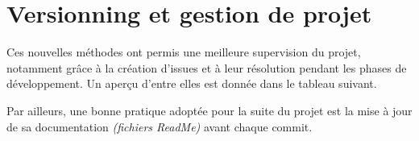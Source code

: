 \section{Versionning et gestion de projet}\label{sec:versionning-et-gestion-de-projet}



    Ces nouvelles méthodes ont permis une meilleure supervision du projet, notamment grâce à la
    création d'issues et à leur résolution pendant les phases de développement.
    Un aperçu d'entre elles est donnée dans le tableau suivant.

    Par ailleurs, une bonne pratique adoptée pour la suite du projet est la mise à jour de sa documentation \textit{(fichiers ReadMe)} avant chaque commit.

